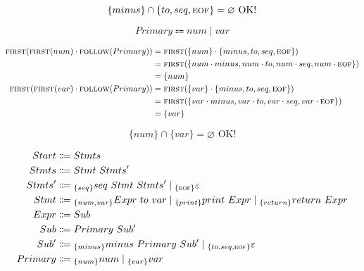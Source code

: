 \documentclass{report}
\newcommand{\Empty}{\varnothing}
\newcommand{\Null}{\varepsilon}
\newcommand{\Seq}{\cdot}
\newcommand{\Spc}{\ }
\newcommand{\Union}{\mathrel{|}}
\newcommand{\FIRST}{\textsc{first}}
\newcommand{\FOLLOW}{\textsc{follow}}
\newcommand{\EOF}{\textsc{eof}}
\newcommand{\Arrow}{\Coloneq}
\newcommand{\NT}[1]{{#1}}
\newcommand{\T}[1]{{#1}}
\newcommand{\Lookahead}[1]{{}_{\{{#1}\}}}
\begin{document}
\begin{equation*}
  \{\T{minus}\} \cap \{\T{to}, \T{seq}, \EOF\} = \Empty \text{ OK!}
\end{equation*}

\begin{equation*}
    \NT{Primary} \Arrow \T{num} \Union \T{var}
\end{equation*}

\begin{equation*}
  \begin{aligned}
    \FIRST(\FIRST(\T{num}) \Seq \FOLLOW(\NT{Primary})) &= \FIRST(\{\T{num}\} \Seq \{\T{minus}, \T{to}, \T{seq}, \EOF\})\\
    &= \FIRST(\{\T{num} \Seq \T{minus}, \T{num} \Seq \T{to}, \T{num} \Seq \T{seq}, \T{num} \Seq \EOF\})\\
    &= \{\T{num}\}\\
    \FIRST(\FIRST(\T{var}) \Seq \FOLLOW(\NT{Primary})) &= \FIRST(\{\T{var}\} \Seq \{\T{minus}, \T{to}, \T{seq}, \EOF\})\\
    &= \FIRST(\{\T{var} \Seq \T{minus}, \T{var} \Seq \T{to}, \T{var} \Seq \T{seq}, \T{var} \Seq \EOF\})\\
    &= \{\T{var}\}
  \end{aligned}
\end{equation*}

\begin{equation*}
  \{\T{num}\} \cap \{\T{var}\} = \Empty \text{ OK!}
\end{equation*}

\begin{equation*}
  \begin{aligned}
    \NT{Start} &\Arrow \NT{Stmts}\\
    \NT{Stmts} &\Arrow \NT{Stmt} \Spc \NT{Stmts'}\\
    \NT{Stmts'} &\Arrow \Lookahead{\T{seq}} \T{seq} \Spc \NT{Stmt} \Spc \NT{Stmts'} \Union \Lookahead{\EOF} \Null\\
    \NT{Stmt} &\Arrow \Lookahead{\T{num}, \T{var}} \NT{Expr} \Spc \T{to} \Spc \T{var} \Union \Lookahead{\T{print}} \T{print} \Spc \NT{Expr} \Union \Lookahead{\T{return}}\NT{return} \Spc \NT{Expr}\\
    \NT{Expr} &\Arrow \NT{Sub}\\
    \NT{Sub} &\Arrow \NT{Primary} \Spc \NT{Sub'}\\
    \NT{Sub'} &\Arrow \Lookahead{\T{minus}} \T{minus} \Spc \NT{Primary} \Spc \NT{Sub'} \Union \Lookahead{\T{to}, \T{seq}, \EOF} \Null\\
    \NT{Primary} &\Arrow \Lookahead{\T{num}} \T{num} \Union \Lookahead{\T{var}} \T{var}
  \end{aligned}
\end{equation*}
\end{document}
